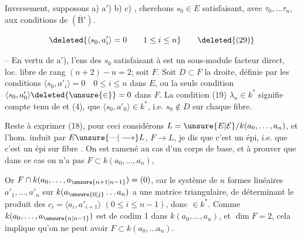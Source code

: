 Inversement, supposons a) a$'$) b) c) , cherchons $s_0\in E$ satisfaisant, avec $\tau_0,\ldots\tau_n$, aux conditions de $(\overline{\mathrm B}')$. 



\[\deleted{\langle s_0,a'_i\rangle=0\qquad1\leq i\leq n}\tag*{\deleted{(29)}}\]

-- En vertu de a$'$), l'ens des $s_0$ satisfaisant à   est un sous-module facteur direct, loc. libre de rang $(n+2)-n=2$;   soit $F$.  Soit $D\subset F$ la droite, définie par les conditions $\langle s_0,a'_i\rangle=0\quad0\leq i\leq n$ dans $E$,  ou la seule condition $\langle s_0,a'_0\rangle\deleted{\unsure{\in}}=0$  dans $F$. La condition (19) $\lambda_n\in k^*$ signifie compte tenu de  et (4), que $\langle s_0,a'_0\rangle\in k^*$,  i.e. $s_0\notin D$ sur chaque fibre.


Reste à exprimer  (18), pour ceci considérons  $L=\unsure{E|\mathcal E}/k(a_0,\ldots,a_n)$, et l'hom. induit par $E\unsure{\text{---}|\longrightarrow}L$, $F\longrightarrow L$,  je dis que c'est un épi, i.e. que c'est un épi sur  fibre . On est ramené au cas d'un corps de base, et à prouver que dans ce cas on n'a pas $F\subset k(a_0,\ldots,a_n)$, 

Or $F\cap k(a_0,\ldots,a_{\unsure{n+1|n-1}})=(0)$, car le système de $n$ formes linéaires $a'_1,\ldots,a'_n$ sur $k(a_{\unsure{0|j}}\ldots a_n)$ a une matrice triangulaire, de déterminant le produit des $c_i=\langle a_i,a'_{i+1}\rangle$ $(0\leq i\leq n-1)$, donc $\in k^*$. Comme $k(a_0,\ldots,a_{\unsure{n|n-1}})$ est de codim 1 dans $k(a_0,\ldots,a_n)$,  et $\dim F=2$, cela implique qu'on ne peut avoir $F\subset k(a_0,\ldots a_n)$.

